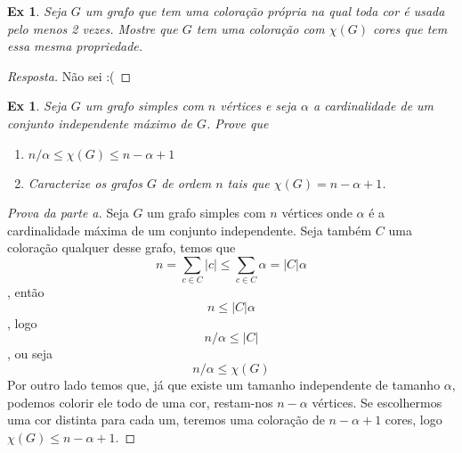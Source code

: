 \documentclass[12pt]{article}
\newcounter{exCounter}
\newtheorem{ex}[exCounter]{Ex}
\begin{document}
\begin{ex}
Seja $G$ um grafo que tem uma coloração própria na qual toda cor é usada pelo menos 2 vezes. Mostre que $G$ tem uma coloração com $\chi(G)$ cores que tem essa mesma propriedade.
\end{ex}

\begin{proof}[Resposta]
Não sei :(



\end{proof}

\begin{ex}
Seja $G$ um grafo simples com $n$ vértices e seja $\alpha$ a cardinalidade de um conjunto independente máximo de $G$. Prove que
\begin{enumerate}[label=(\alph*)]
    \item $n/\alpha \leq \chi(G) \leq n - \alpha + 1$
    \item Caracterize os grafos $G$ de ordem $n$ tais que $\chi(G) = n - \alpha + 1$.
\end{enumerate}
\end{ex}

\begin{proof}[Prova da parte a]
Seja $G$ um grafo simples com $n$ vértices onde $\alpha$ é a cardinalidade máxima de um conjunto independente. Seja também $C$ uma coloração qualquer desse grafo, temos que
$$ n = \sum\limits_{c \in C} |c| \leq \sum\limits_{c \in C} \alpha = |C| \alpha $$, então
$$ n \leq |C| \alpha $$, logo
$$ n/\alpha \leq |C| $$, ou seja
$$ n/\alpha \leq \chi(G) $$
Por outro lado temos que, já que existe um tamanho independente de tamanho $\alpha$, podemos colorir ele todo de uma cor, restam-nos $n-\alpha$ vértices. Se escolhermos uma cor distinta para cada um, teremos uma coloração de $n-\alpha+1$ cores, logo $\chi(G) \leq n-\alpha+1$.
\end{proof}
\end{document}
